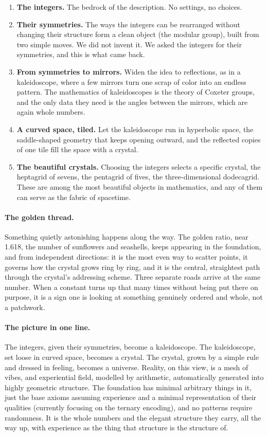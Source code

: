 \begin{enumerate}
\item \textbf{The integers.} The bedrock of the description. No settings, no choices.
\item \textbf{Their symmetries.} The ways the integers can be rearranged without changing
their structure form a clean object (the modular group), built from two simple moves. We did
not invent it. We asked the integers for their symmetries, and this is what came back.
\item \textbf{From symmetries to mirrors.} Widen the idea to reflections, as in a
kaleidoscope, where a few mirrors turn one scrap of color into an endless pattern. The
mathematics of kaleidoscopes is the theory of Coxeter groups, and the only data they need is
the angles between the mirrors, which are again whole numbers.
\item \textbf{A curved space, tiled.} Let the kaleidoscope run in hyperbolic space, the
saddle-shaped geometry that keeps opening outward, and the reflected copies of one tile fill
the space with a crystal.
\item \textbf{The beautiful crystals.} Choosing the integers selects a specific crystal, the
heptagrid of sevens, the pentagrid of fives, the three-dimensional dodecagrid. These are among
the most beautiful objects in mathematics, and any of them can serve as the fabric of
spacetime.
\end{enumerate}

\paragraph{The golden thread.}
Something quietly astonishing happens along the way. The golden ratio, near 1.618, the number
of sunflowers and seashells, keeps appearing in the foundation, and from independent
directions: it is the most even way to scatter points, it governs how the crystal grows ring
by ring, and it is the central, straightest path through the crystal's addressing scheme.
Three separate roads arrive at the same number. When a constant turns up that many times
without being put there on purpose, it is a sign one is looking at something genuinely
ordered and whole, not a patchwork.

\paragraph{The picture in one line.}
The integers, given their symmetries, become a kaleidoscope. The kaleidoscope, set loose in
curved space, becomes a crystal. The crystal, grown by a simple rule and dressed in feeling,
becomes a universe. Reality, on this view, is a mesh of vibes, and experiential field,
modelled by arithmetic, automatically generated into highly geometric structure.
The foundation has minimal arbitrary things in it, just the base axioms assuming experience and a minimal
representation of their qualities (currently focusing on the ternary encoding), and no patterns require randomness.
It is the whole numbers and the elegant structure they carry, all the way up, with experience as the thing
that structure is the structure of.

